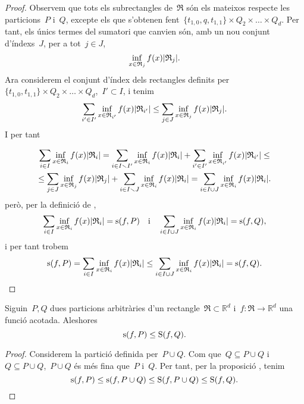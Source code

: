 \documentclass[../../main.tex]{subfiles}
\begin{document}
\begin{proposition}
\begin{proof}
			Observem que tots els subrectangles de~\(\mathfrak{R}\) són els mateixos respecte les particions~\(P\) i~\(Q\), excepte els que s'obtenen fent~\(\{t_{1,0},q,t_{1,1}\}\times Q_{2}\times\dots\times Q_{d}\).
			Per tant, els únics termes del sumatori que canvien són, amb un nou conjunt d'índexs~\(J\), per a tot~\(j\in J\),
			\[
			    \inf_{x\in \mathfrak{R}_{j}}f(x)\abs{\mathfrak{R}_{j}}.
			\]
			Ara considerem el conjunt d'índex dels rectangles definits per~\(\{t_{1,0},t_{1,1}\}\times Q_{2}\times\dots\times Q_{d}\),~\(I'\subset I\), i tenim
			\[
			    \sum_{i'\in I'}\inf_{x\in \mathfrak{R}_{i'}}f(x)\abs{\mathfrak{R}_{i'}}\leq\sum_{j\in J}\inf_{x\in \mathfrak{R}_{j}}f(x)\abs{\mathfrak{R}_{j}}.
			\]
			I per tant%
				\begin{comment}
					\marginpar{Cut my life into pieces\\
					This is my last resort\\
					Suffocation\hfil\twonotes\hfil\\
					No breathing\\
					Don't give a fuck\\
					if I cut my arm, bleeding}
				\end{comment}
			\begin{multline*}
			\sum_{i\in I}\inf_{x\in \mathfrak{R}_{i}}f(x)\abs{\mathfrak{R}_{i}}=
			\sum_{i\in I\smallsetminus I'}\inf_{x\in \mathfrak{R}_{i}}f(x)\abs{\mathfrak{R}_{i}}+\sum_{i'\in I'}\inf_{x\in \mathfrak{R}_{i'}}f(x)\abs{\mathfrak{R}_{i'}}\leq\\
			\leq\sum_{j\in J}\inf_{x\in \mathfrak{R}_{j}}f(x)\abs{\mathfrak{R}_{j}}+\sum_{i\in I\smallsetminus J}\inf_{x\in \mathfrak{R}_{i}}f(x)\abs{\mathfrak{R}_{i}}
			=\sum_{i\in I\cup J}\inf_{x\in \mathfrak{R}_{i}}f(x)\abs{\mathfrak{R}_{i}}.
			\end{multline*}
			però, per la definició de ,
			\[
			    \sum_{i\in I}\inf_{x\in \mathfrak{R}_{i}}f(x)\abs{\mathfrak{R}_{i}}=\sinf(f,P)\quad\text{i}\quad\sum_{i\in I\cup J}\inf_{x\in \mathfrak{R}_{i}}f(x)\abs{\mathfrak{R}_{i}}=\sinf(f,Q),
			\]
			i per tant trobem
			\[
			    \sinf(f,P)=\sum_{i\in I}\inf_{x\in \mathfrak{R}_{i}}f(x)\abs{\mathfrak{R}_{i}}\leq\sum_{i\in I\cup J}\inf_{x\in \mathfrak{R}_{i}}f(x)\abs{\mathfrak{R}_{i}}=\sinf(f,Q).\qedhere
			\]
		\end{proof}
	\end{proposition}
	\begin{proposition}
		\label{prop:Sumes i finor de particions}
		Siguin~\(P,Q\) dues particions arbitràries d'un rectangle~\(\mathfrak{R}\subset\mathbb{R}^{d}\) i~\(f\colon\mathfrak{R}\to\mathbb{R}^{d}\) una funció acotada.
		Aleshores
		\[
		    \operatorname{s}(f,P)\leq\operatorname{S}(f,Q).
		\]
		\begin{proof}
			Considerem la partició definida per~\(P\cup Q\).
			Com que~\(Q\subseteq P\cup Q\) i~\(Q\subseteq P\cup Q\),~\(P\cup Q\) és més fina que~\(P\) i~\(Q\).
			Per tant, per la proposició , tenim
			\[
			    \operatorname{s}(f,P)\leq\operatorname{s}(f,P\cup Q)\leq\operatorname{S}(f,P\cup Q)\leq\operatorname{S}(f,Q).\qedhere
			\]
		\end{proof}
	\end{proposition}
\end{document}
